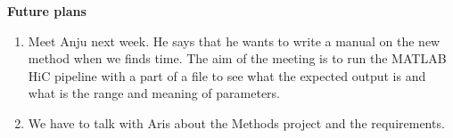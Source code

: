 \documentclass[idxtotoc,hyperref,openany]{labbook} %
\newcommand{\HRule}{\rule{\linewidth}{0.5mm}} %
\begin{document}
	


\textbf{Future plans}

\begin{enumerate}
	\item Meet Anju next week. He says that he wants to write a manual
	on the new method when we finds time. The aim of the meeting is to run
	the MATLAB HiC pipeline with a part of a file to see what the expected output is and what is the range and meaning of parameters.
	\item We have to talk with Aris about the Methods project and the requirements.
\end{enumerate}









\end{document}
